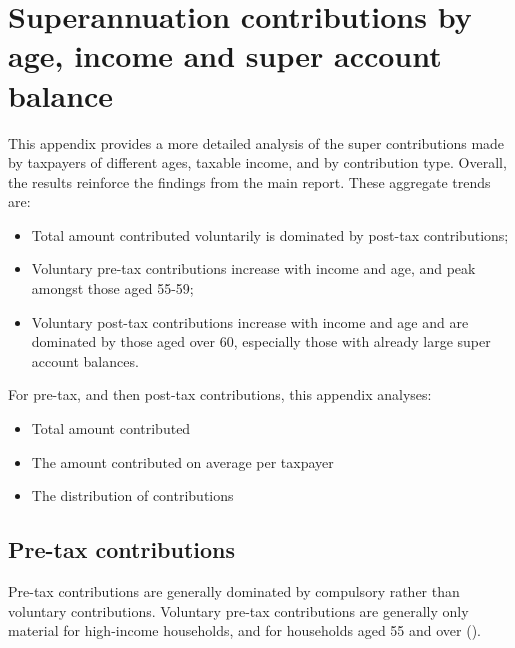 \documentclass{grattanAlpha}
\begin{document}
\appendix




\chapter{Superannuation contributions by age, income and super account balance}\label{appendix:SUPER-A}
This appendix provides a more detailed analysis of the super contributions made by taxpayers of different ages, taxable income, and by contribution type. Overall, the results reinforce the findings from the main report. These aggregate trends are:
\begin{itemize}
\item Total amount contributed voluntarily is dominated by post-tax contributions; 
\item Voluntary pre-tax contributions increase with income and age, and peak amongst those aged 55-59;
\item Voluntary post-tax contributions increase with income and age and are dominated by those aged over 60, especially those with already large super account balances.
\end{itemize}
For pre-tax, and then post-tax contributions, this appendix analyses:
\begin{itemize}
\item Total amount contributed
\item The amount contributed on average per taxpayer
\item The distribution of contributions
\end{itemize}
\section{Pre-tax contributions}
Pre-tax contributions are generally dominated by compulsory rather than voluntary contributions. Voluntary pre-tax contributions are generally only material for high-income households, and for households aged 55 and over ().
\end{document}
